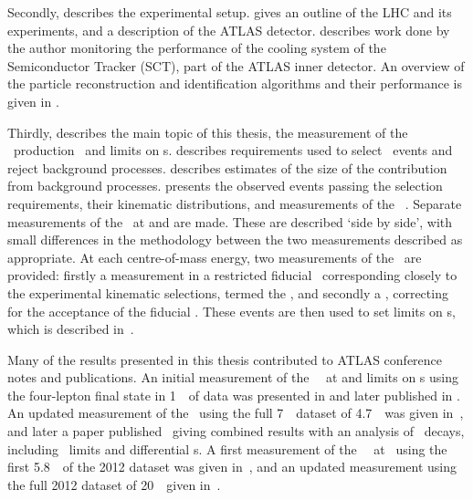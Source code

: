 Secondly,  describes the experimental setup.
 gives an outline of the LHC and its experiments, and a
description of the ATLAS detector.  describes work done by the author
monitoring the performance of the cooling system of the Semiconductor Tracker
(SCT), part of the ATLAS inner detector. An overview of the particle reconstruction and
identification algorithms and their performance is given in
.

Thirdly,  describes the main topic of this thesis, the
measurement of the \ZZ\ production \cx\ and limits on \TGC s. 
 describes requirements used to select \ZZ\
events and reject background processes.  describes
estimates of the size of the contribution from background processes.
\chap{CrossSection} presents the observed events passing the selection
requirements, their kinematic distributions, and measurements of the \ZZ\ \cx.
Separate measurements of the \cx\ at \sqrtseq{7} and \sqrtseq{8} are made. These
are described `side by side', with small differences in the methodology between
the two measurements described as appropriate. At each centre-of-mass energy,
two measurements of the \cx\ are provided: firstly a measurement in a restricted
fiducial \phasespace\ corresponding closely to the experimental kinematic
selections, termed the \intro{fiducial \cx}, and secondly a \intro{total} \cx,
correcting for the acceptance of the fiducial \phasespace.
These events are then used to set limits on \TGC s, which is described
in~\chap{TGCLimits}.

Many of the results presented in this thesis contributed to ATLAS conference
notes and publications. An initial measurement of the \ZZ\ \cx\ at 
and limits on \TGC s using the four-lepton final state in 1~\ifb\ of data was
presented in \cite{ATLAS-CONF-2011-107} and later published in
\cite{ATLAS_ZZ4l:1fb2011}. An updated measurement of the \cx\ using the full
7~\tev\ dataset of 4.7~\ifb\ was given in~\cite{ATLAS-CONF-2012-026}, and later
a paper published~\cite{ATLAS:2012kg} giving combined results with an analysis
of \ZZllvv\ decays, including \TGC\ limits and differential \cx s.
A first measurement of the \ZZ\ \cx\ at \sqrtseq{8} \cx\ using the first
5.8~\ifb\ of the 2012 dataset was given in~\cite{ATLAS-CONF-2012-090}, and an
updated measurement using the full 2012 dataset of 20~\ifb\ given in~\cite{ATLAS-CONF-2013-020}.


